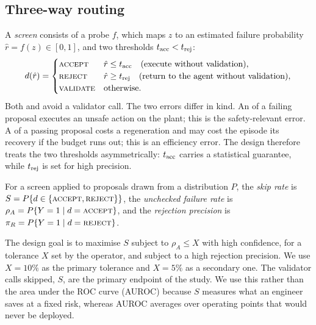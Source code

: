 \subsection{Three-way routing}
A \emph{screen} consists of a probe $f$, which maps $z$ to an estimated failure probability $\hat r=f(z)\in[0,1]$,
and two thresholds $t_{\mathrm{acc}}<t_{\mathrm{rej}}$:
\begin{equation}\label{eq:route}
d(\hat r)=\begin{cases}
\textsc{accept} & \hat r\le t_{\mathrm{acc}} \quad\text{(execute without validation)},\\
\textsc{reject} & \hat r\ge t_{\mathrm{rej}} \quad\text{(return to the agent without validation)},\\
\textsc{validate} & \text{otherwise}.
\end{cases}
\end{equation}
Both \ACC{} and \REJ{} avoid a validator call. The two errors differ in kind. An \ACC{} of a failing proposal
executes an unsafe action on the plant; this is the safety-relevant error. A \REJ{} of a passing proposal costs
a regeneration and may cost the episode its recovery if the budget runs out; this is an efficiency error. The
design therefore treats the two thresholds asymmetrically: $t_{\mathrm{acc}}$ carries a statistical guarantee, while
$t_{\mathrm{rej}}$ is set for high precision.

\begin{definition}\label{def:metrics}
For a screen applied to proposals drawn from a distribution $P$, the \emph{skip rate} is
$S=P\{d\in\{\textsc{accept},\textsc{reject}\}\}$, the \emph{unchecked failure rate} is $\rho_{A}=P\{Y=1\mid d=\textsc{accept}\}$, and the
\emph{rejection precision} is $\pi_{R}=P\{Y=1\mid d=\textsc{reject}\}$.
\end{definition}

The design goal is to maximise $S$ subject to $\rho_A\le X$ with high confidence, for a tolerance $X$ set by the
operator, and subject to a high rejection precision. We use $X=10\%$ as the primary tolerance and $X=5\%$ as a
secondary one. The validator calls skipped, $S$, are the primary endpoint of the study. We use this rather than
the area under the ROC curve (AUROC) because $S$ measures what an engineer saves at a fixed risk, whereas AUROC
averages over operating points that would never be deployed.

